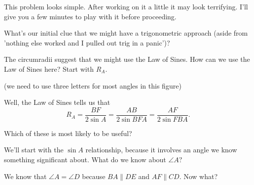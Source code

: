 This problem looks simple.  After working on it a little it may look terrifying.  I'll give you a few minutes to play with it before proceeding.

What's our initial clue that we might have a trigonometric approach (aside from 'nothing else worked and I pulled out trig in a panic')?



The circumradii suggest that we might use the Law of Sines.  How can we use the Law of Sines here?  Start with $R_A$.

(we need to use three letters for most angles in this figure)


Well, the Law of Sines tells us that $$R_A = \frac{BF}{2 \sin A} = \frac{AB}{2 \sin BFA} = \frac{AF}{2 \sin FBA}.$$

Which of these is most likely to be useful?



We'll start with the $\sin A$ relationship, because it involves an angle we know something significant about.  What do we know about $\angle A?$





We know that $\angle A = \angle D$ because $BA \parallel DE$ and $AF \parallel CD.$  Now what?

